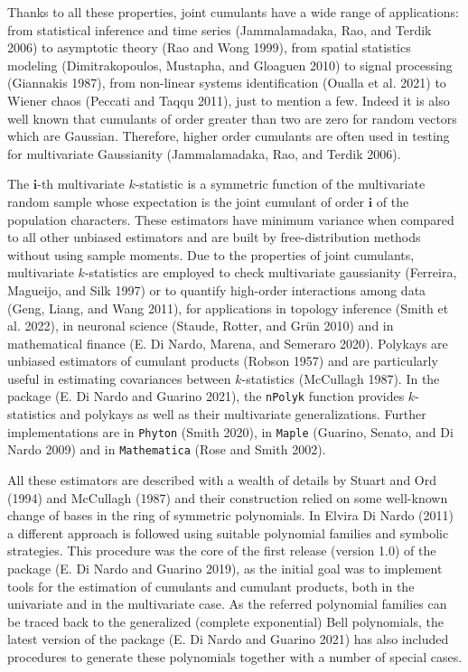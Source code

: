 Thanks to all these properties, joint cumulants have a wide range of applications: from statistical inference and time series (Jammalamadaka, Rao, and Terdik 2006) to asymptotic theory (Rao and Wong 1999), from spatial statistics modeling (Dimitrakopoulos, Mustapha, and Gloaguen 2010) to signal processing (Giannakis 1987), from non-linear systems identification (Oualla et al. 2021) to Wiener chaos (Peccati and Taqqu 2011), just to mention a few. Indeed it is also well known that cumulants of order greater than two are zero for random vectors which are Gaussian. Therefore, higher order cumulants are often used in testing for multivariate Gaussianity (Jammalamadaka, Rao, and Terdik 2006).

The \(\boldsymbol{i}\)-th multivariate \(k\)-statistic is a symmetric function of the multivariate random sample whose expectation is the joint cumulant of order \(\boldsymbol{i}\) of the population characters. These estimators have minimum variance when compared to all other unbiased estimators and are built by free-distribution methods without using sample moments. Due to the properties of joint cumulants, multivariate \(k\)-statistics are employed to check multivariate gaussianity (Ferreira, Magueijo, and Silk 1997) or to quantify high-order interactions among data (Geng, Liang, and Wang 2011), for applications in topology inference (Smith et al. 2022), in neuronal science (Staude, Rotter, and Grün 2010) and in mathematical finance (E. Di Nardo, Marena, and Semeraro 2020). Polykays are unbiased estimators of cumulant products (Robson 1957) and are particularly useful in estimating covariances between \(k\)-statistics (McCullagh 1987). In the  package (E. Di Nardo and Guarino 2021), the \texttt{nPolyk} function provides \(k\)-statistics and polykays as well as their multivariate generalizations. Further implementations are in \texttt{Phyton} (Smith 2020), in \texttt{Maple} (Guarino, Senato, and Di Nardo 2009) and in \texttt{Mathematica} (Rose and Smith 2002).

All these estimators are described with a wealth of details by Stuart and Ord (1994) and McCullagh (1987) and their construction relied on some well-known change of bases in the ring of symmetric polynomials. In Elvira Di Nardo (2011) a different approach is followed using suitable polynomial families and symbolic strategies. This procedure was the core of the first release (version 1.0) of the  package (E. Di Nardo and Guarino 2019), as the initial goal was to implement tools for the estimation of cumulants and cumulant products, both in the univariate and in the multivariate case. As the referred polynomial families can be traced back to the generalized (complete exponential) Bell polynomials, the latest version of the package (E. Di Nardo and Guarino 2021) has also included procedures to generate these polynomials together with a number of special cases.

